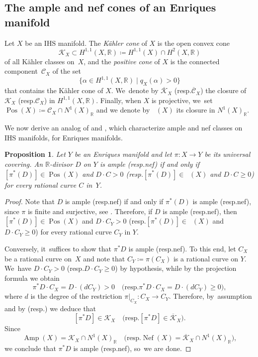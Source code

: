 \documentclass[10pt]{amsart}
\newcommand{\resp}{resp.}
\theoremstyle{plain}
\newtheorem{prop}[thm]{Proposition}
\theoremstyle{definition}
\newcommand{\R}{\mathbb{R}}
\DeclareMathOperator{\Amp}{\mathrm{Amp}}
\DeclareMathOperator{\Nef}{\mathrm{Nef}}
\DeclareMathOperator{\Pos}{\mathrm{Pos}}
\DeclareMathOperator{\Posb}{\overline{\mathrm{Pos}}}
\begin{document}
\subsection{The ample and nef cones of an Enriques manifold}

Let $X$ be an IHS manifold. The \emph{Kähler cone} of $X$ is the open convex cone
\[
\mathcal{K}_X \subset H^{1,1}(X,\R) \coloneqq H^{1,1}(X) \cap H^2(X,\R)
\]
of all Kähler classes on~$X$, and the \emph{positive cone} of $X$ is the connected component~$\mathcal{C}_X$ of the set
\[
\bigl\{ \alpha \in H^{1,1}(X,\R) \mid q_X(\alpha) > 0 \bigr\}
\]
that contains the Kähler cone of $X$. We~denote by $\overline{\mathcal{K}}_X$ (\resp $\overline{\mathcal{C}}_X$) the closure of~$\mathcal{K}_X$ (\resp $\mathcal{C}_X$) in $H^{1,1}(X,\R)$. Finally, when $X$ is projective, we~set \hbox{$ \Pos(X) \!\coloneqq\! \mathcal{C}_X \!\cap\! N^1(X)_\R $} and we denote by $\Posb(X)$ its closure in $N^1(X)_\R$.

We now derive an analog of \cite[Th.\,1.2]{Boucksom01} and \cite[Prop.\,3.2]{Huy03}, which characterize ample and nef classes on IHS manifolds, for Enriques manifolds.

\begin{prop}
\label{prop:positivity_on_Enriques}
Let $Y$ be an Enriques manifold and let $\pi \colon X \to Y$ be its universal covering. An $\R$\nobreakdash-divisor $D$ on $Y$ is ample (\resp nef) if and only if $[\pi^*(D)] \in \Pos(X)$ and $D \cdot C \!>\! 0$ (\resp $[\pi^*(D)] \!\in\! \Posb(X)$ and $D \cdot C \!\geq\! 0$) for every rational curve $C$ in~$Y$.
\end{prop}

\begin{proof}
Note that $D$ is ample (\resp nef) if and only if $\pi^*(D)$ is ample (\resp nef), since $\pi$ is finite and surjective, see \cite[Prop.\,1.2.13, Cor.\,1.2.28 \& Ex.\,1.4.4]{Laz04book_I}. Therefore, if $D$ is ample (\resp nef), then $[\pi^*(D)] \in \Pos(X)$ and $D \cdot C_Y > 0$ (\resp $[\pi^*(D)] \in \Posb(X)$ and $D \cdot C_Y \geq 0$) for every rational curve $C_Y$ in $Y$.

Conversely, it~suffices to show that $\pi^* D$ is ample (\resp nef). To this end, let $C_X$ be a rational curve on~$X$ and note that $C_Y \coloneq \pi(C_X)$ is a rational curve on $Y$. We~have $D \cdot C_Y > 0$ (\resp $D \cdot C_Y \geq 0$) by hypothesis, while by the projection formula we obtain
\[
\pi^* D \cdot C_X = D \cdot (d C_Y) > 0 \quad \bigl(\text{\resp } \pi^* D \cdot C_X = D \cdot (d C_Y) \geq 0 \bigr),
\]
where $d$ is the degree of the restriction $\pi |_{C_X} \colon C_X \to C_Y$. Therefore, by~assumption and by \cite[Th.\,1.2]{Boucksom01} (\resp \cite[Prop.\,3.2]{Huy03})
we deduce that
\[
[\pi^* D] \in \mathcal{K}_X \quad \bigl(\text{\resp } [\pi^* D] \in \overline{\mathcal{K}}_X \bigr).
\]
Since
\[
\Amp(X) = \mathcal{K}_X \cap N^1(X)_\R \quad \bigl(\text{\resp } \Nef(X) = \overline{\mathcal{K}}_X \cap N^1(X)_\R \bigr),
\]
we conclude that $\pi^* D$ is ample (\resp nef), so~we are done.
\end{proof}
\end{document}
